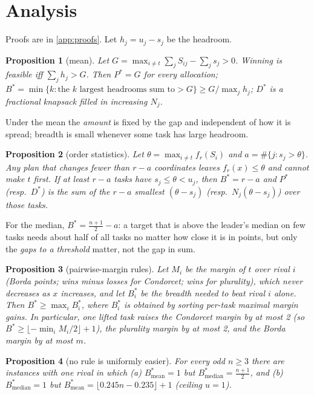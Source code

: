 \documentclass{article}
\theoremstyle{plain}
\newtheorem{proposition}{Proposition}
\theoremstyle{definition}
\theoremstyle{remark}
\newcommand{\Bst}{B^{\ast}}
\newcommand{\Pst}{P^{\ast}}
\newcommand{\Dst}{D^{\ast}}
\begin{document}
\section{Analysis}\label{sec:theory}
Proofs are in \cref{app:proofs}. Let $h_j=u_j-s_j$ be the headroom.
\begin{proposition}[mean]\label{p:mean}
Let $G=\max_{i\ne t}\sum_jS_{ij}-\sum_js_j>0$. Winning is feasible iff $\sum_jh_j>G$. Then $\Pst=G$ for every allocation; $\Bst=\min\{k:\text{the $k$ largest headrooms sum to}>G\}\ge G/\max_jh_j$; $\Dst$ is a fractional knapsack filled in increasing $N_j$.
\end{proposition}
Under the mean the \emph{amount} is fixed by the gap and independent of how it is spread; breadth is small whenever some task has large headroom.
\begin{proposition}[order statistics]\label{p:quantile}
Let $\theta=\max_{i\neq t}f_r(S_i)$ and $a=\#\{j:s_j>\theta\}$. Any plan that changes fewer than $r-a$ coordinates leaves $f_r(x)\le\theta$ and cannot make $t$ first. If at least $r-a$ tasks have $s_j\le\theta<u_j$, then $\Bst=r-a$ and $\Pst$ (resp.\ $\Dst$) is the sum of the $r-a$ smallest $(\theta-s_j)$ (resp.\ $N_j(\theta-s_j)$) over those tasks.
\end{proposition}
For the median, $\Bst=\frac{n+1}{2}-a$: a target that is above the leader's median on few tasks needs about half of all tasks no matter how close it is in points, but only the \emph{gaps to a threshold} matter, not the gap in sum.
\begin{proposition}[pairwise-margin rules]\label{p:margin}
Let $M_i$ be the margin of $t$ over rival $i$ (Borda points; wins minus losses for Condorcet; wins for plurality), which never decreases as $x$ increases, and let $\Bst_i$ be the breadth needed to beat rival $i$ \emph{alone}. Then $\Bst\ge\max_i\Bst_i$, where $\Bst_i$ is obtained by sorting per-task maximal margin gains. In particular, one lifted task raises the Condorcet margin by at most 2 (so $\Bst\ge\lfloor -\min_i M_i/2\rfloor+1$), the plurality margin by at most 2, and the Borda margin by at most $m$.
\end{proposition}
\begin{proposition}[no rule is uniformly easier]\label{p:sep}
For every odd $n\ge3$ there are instances with one rival in which (a) $\Bst_{\text{mean}}=1$ but $\Bst_{\text{median}}=\frac{n+1}2$, and (b) $\Bst_{\text{median}}=1$ but $\Bst_{\text{mean}}=\lfloor0.245n-0.235\rfloor+1$ (ceiling $u=1$).
\end{proposition}
\end{document}
